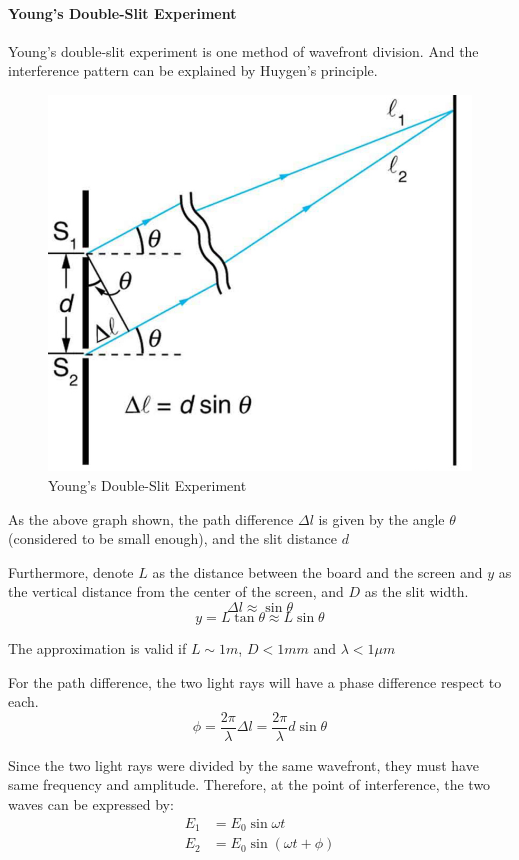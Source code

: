 \documentclass[UTF8]{book}
\begin{document}
\paragraph{Young's Double-Slit Experiment}
Young's double-slit experiment is one method of wavefront division. And the interference pattern can be explained by Huygen's principle. 
\begin{figure}[H]
\centering
\label{fig:17}
\includegraphics[scale=0.5]{Figure/17.PNG}
\caption{Young's Double-Slit Experiment}
\end{figure}
As the above graph shown, the path difference $\Delta l$ is given by the angle $\theta $ (considered to be small enough), and the slit distance $d$

Furthermore, denote $L$ as the distance between the board and the screen and $y$ as the vertical distance from the center of the screen, and $D$ as the slit width. 
\[\Delta l\approx \sin \theta \]
\[y =L\tan \theta \approx L\sin \theta \]

The approximation is valid if $L\sim 1m$, $D < 1mm$ and $\lambda < 1\mu m$

For the path difference, the two light rays will have a phase difference respect to each. 
\[\phi =\frac{2\pi }{\lambda }\Delta l=\frac{2\pi }{\lambda }d\sin \theta\]

Since the two light rays were divided by the same wavefront, they must have same frequency and amplitude. Therefore, at the point of interference, the two waves can be expressed by:
\begin{align*}
E_1&=E_0\sin \omega t\\
E_2&=E_0\sin (\omega t+\phi )
\end{align*}
\end{document}
